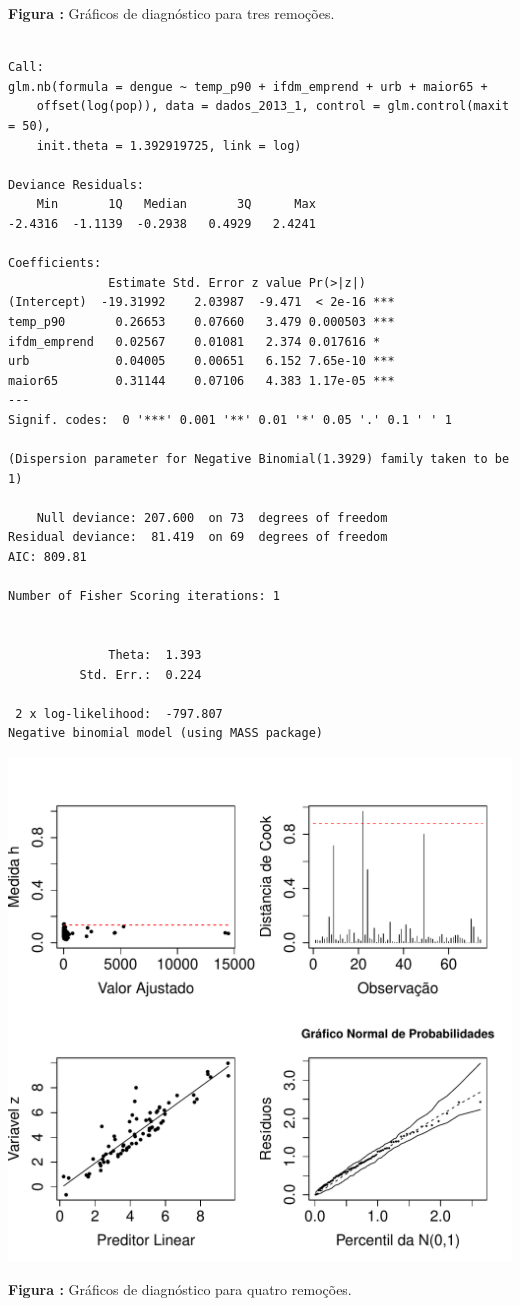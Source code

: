 \documentclass[12pt,a4paper]{article}\usepackage[]{graphicx}\usepackage[]{color}
\makeatletter
\def\maxwidth{ %
  \ifdim\Gin@nat@width>\linewidth
    \linewidth
  \else
    \Gin@nat@width
  \fi
}
\newenvironment{kframe}{%
 \def\at@end@of@kframe{}%
 \ifinner\ifhmode%
  \def\at@end@of@kframe{\end{minipage}}%
  \begin{minipage}{\columnwidth}%
 \fi\fi%
 \def\FrameCommand##1{\hskip\@totalleftmargin \hskip-\fboxsep
 \colorbox{shadecolor}{##1}\hskip-\fboxsep
     \hskip-\linewidth \hskip-\@totalleftmargin \hskip\columnwidth}%
 \MakeFramed {\advance\hsize-\width
   \@totalleftmargin\z@ \linewidth\hsize
   \@setminipage}}%
 {\par\unskip\endMakeFramed%
 \at@end@of@kframe}
\newenvironment{knitrout}{}{} %
\makeatother
\begin{document}
\textbf{Figura :} Gráficos de diagnóstico para tres remoções.




\begin{knitrout}
\color{fgcolor}\begin{kframe}
\begin{verbatim}

Call:
glm.nb(formula = dengue ~ temp_p90 + ifdm_emprend + urb + maior65 + 
    offset(log(pop)), data = dados_2013_1, control = glm.control(maxit = 50), 
    init.theta = 1.392919725, link = log)

Deviance Residuals: 
    Min       1Q   Median       3Q      Max  
-2.4316  -1.1139  -0.2938   0.4929   2.4241  

Coefficients:
              Estimate Std. Error z value Pr(>|z|)    
(Intercept)  -19.31992    2.03987  -9.471  < 2e-16 ***
temp_p90       0.26653    0.07660   3.479 0.000503 ***
ifdm_emprend   0.02567    0.01081   2.374 0.017616 *  
urb            0.04005    0.00651   6.152 7.65e-10 ***
maior65        0.31144    0.07106   4.383 1.17e-05 ***
---
Signif. codes:  0 '***' 0.001 '**' 0.01 '*' 0.05 '.' 0.1 ' ' 1

(Dispersion parameter for Negative Binomial(1.3929) family taken to be 1)

    Null deviance: 207.600  on 73  degrees of freedom
Residual deviance:  81.419  on 69  degrees of freedom
AIC: 809.81

Number of Fisher Scoring iterations: 1


              Theta:  1.393 
          Std. Err.:  0.224 

 2 x log-likelihood:  -797.807 
Negative binomial model (using MASS package) 
\end{verbatim}
\end{kframe}
\includegraphics[width=\maxwidth]{figure/unnamed-chunk-28-1} 

\end{knitrout}
\textbf{Figura :} Gráficos de diagnóstico para quatro remoções.
\end{document}
